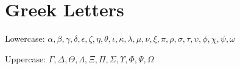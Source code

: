 \documentclass{article}
\begin{document}
\section*{Greek Letters}

Lowercase: $\alpha, \beta, \gamma, \delta, \epsilon, \zeta, \eta, \theta, \iota, \kappa, \lambda, \mu, \nu, \xi, \pi, \rho, \sigma, \tau, \upsilon, \phi, \chi, \psi, \omega$

Uppercase: $\Gamma, \Delta, \Theta, \Lambda, \Xi, \Pi, \Sigma, \Upsilon, \Phi, \Psi, \Omega$
\end{document}
